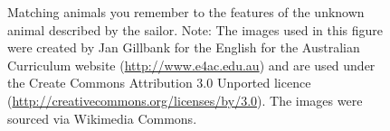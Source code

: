 \documentclass[xcolor={table}]{beamer}
\begin{document}
 \begin{frame} [plain]
\begin{figure}[htb]
	\begin{center}
	\end{center}
       \caption{Matching animals you remember to the features of the unknown animal described by the sailor. Note: The images used in this figure were created by Jan Gillbank for the English for the Australian Curriculum website (\url{http://www.e4ac.edu.au}) and are used under the Create Commons Attribution 3.0 Unported licence (\url{http://creativecommons.org/licenses/by/3.0}). The images were sourced via Wikimedia Commons.}	
	\label{fig:animalFeatureMatching}
\end{figure}
\end{frame} 
\end{document}
